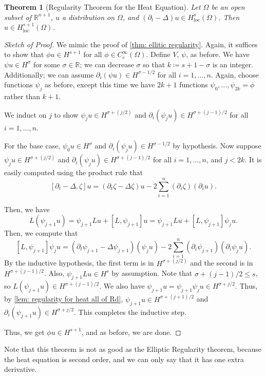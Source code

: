\documentclass[12pt,letterpaper,reqno]{article}
\theoremstyle{plain}                              %
\newtheorem{thm}{Theorem}[section]
\theoremstyle{definition}                         %
\theoremstyle{remark}                             %
\numberwithin{equation}{section}
\newcommand{\R}{\mathbb{R}}                     %
\begin{document}
\begin{thm}[Regularity Theorem for the Heat Equation] 
    Let $\Omega$ be an open subset of $\R^{n+1}$, $u$ a distribution on $\Omega$, and $(\partial_t - \Delta)u \in H_\mathrm{loc}^{s}(\Omega)$. Then $u\in H_{\mathrm{loc}}^{s+1}(\Omega)$.
\end{thm}
\begin{proof}[Sketch of Proof]
    We mimic the proof of \cref{thm: ellitic regularity}. Again, it suffices to show that $\phi u \in H^{s+1}$ for all $\phi\in C_c^\infty(\Omega)$. Define $V$, $\psi$, as before. We have $\psi u \in H^\sigma$ for some $\sigma \in \R$; we can decrease $\sigma$ so that $k \coloneqq s+1-\sigma$ is an integer. Additionally; we can assume $\partial_i (\psi u) \in H^{\sigma -1/2}$ for all $i=1,\ldots, n$. Again, choose functions $\psi_j$ as before, except this time we have $2k+1$ functions $\psi_0,\ldots, \psi_{2k}=\phi$ rather than $k+1$. 
    
    We induct on $j$ to show $\psi_j u \in H^{\sigma + (j/2)}$ and $\partial_{i}(\psi_j u)\in H^{\sigma + (j-1)/2}$ for all $i=1,\ldots, n$. 
    
    For the base case, $\psi_0 u \in H^{\sigma}$ and $\partial_i (\psi_j u)\in H^{\sigma -1/2}$ by hypothesis. Now suppose $\psi_j u \in H^{\sigma + (j/2)}$ and $\partial_{i}(\psi_j u)\in H^{\sigma + (j-1)/2}$ for all $i=1,\ldots, n$, and $j<2k$. It is easily computed using the product rule that
    \[[\partial_t - \Delta, \zeta] u = (\partial_t \zeta - \Delta \zeta)u - 2 \sum_{i=1}^n (\partial_i \zeta)(\partial_i u).\]

    Then, we have
    \[L(\psi_{j+1}u) = \psi_{j+1} Lu + [L,\psi_{j+1}]u = \psi_{j+1}Lu + [L,\psi_{j+1}]\psi_j u.\]
    Then, we compute that
    \[[L,\psi_{j+1}]\psi_j u = (\partial_t \psi_{j+1}-\Delta \psi_{j+1})(\psi_j u)-2\sum_{i=1}^n (\partial_i \psi_{j+1})(\partial_i \psi_j u).\]
    By the inductive hypothesis, the first term is in $H^{\sigma + (j/2)}$ and the second is in $H^{\sigma + (j-1)/2}$. Also, $\psi_{j+1}Lu \in H^s$ by assumption. Note that $\sigma + (j-1)/2\le s$, so $L(\psi_{j+1}u) \in H^{\sigma + (j-1)/2}$. We also have $\psi_{j+1}u = \psi_{j+1}\psi_j u \in H^{\sigma + j/2}$. Thus, by \cref{lem: regularity for heat all of Rd}, $\psi_{j+1}u \in H^{\sigma + (j+1)/2}$ and $\partial_i (\psi_{j+1}u)\in H^{\sigma + j/2}$. This completes the inductive step.

    Thus, we get $\phi u \in H^{s+1}$, and as before, we are done.
\end{proof}
Note that this theorem is not as good as the Elliptic Regularity theorem, because the heat equation is second order, and we can only say that it has one extra derivative.
\end{document}
